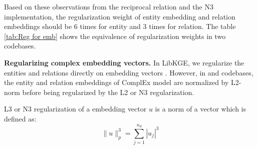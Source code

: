Based on these observations from the reciprocal relation and the N3 implementation, the regularization weight of entity embedding and relation embeddings should be 6 times for entity and 3 times for relation. The table \ref{tab:Reg for emb} shows the equivalence of regularization weights in two codebases.
\newline


\begin{table}[!htbp]
\centering
{}
\caption{Equivalence of regularization weights in two codebases}
\label{tab:Reg for emb}
\end{table}


\noindent\textbf{Regularizing complex embedding vectors.} In LibKGE, we regularize the entities and relations directly on embedding vectors \citep{Ruffinelli2020You}. However, in \citet{chen2021relation} and \citet{lacroix2018canonical} codebases, the entity and relation embeddings of ComplEx model are normalized by L2-norm before being regularized by the L2 or N3 regularization. 

L3 or N3 regularization of a embedding vector $u$ is a norm of a vector which is defined as:
\begin{equation}
    \label{eq:N3}
    \|u \|^3_p = \sum_{j=1}^{n_d}|u_j|^3
\end{equation}

